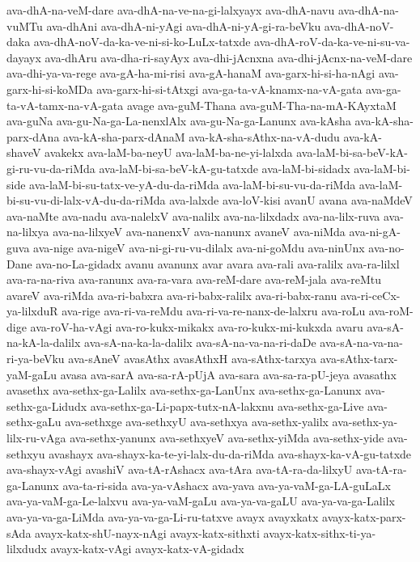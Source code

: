 {ava-dhA-na-veM-dare
ava-dhA-na-ve-na-gi-lalxyayx
ava-dhA-navu
ava-dhA-na-vuMTu
ava-dhAni
ava-dhA-ni-yAgi
ava-dhA-ni-yA-gi-ra-beVku
ava-dhA-noV-daka
ava-dhA-noV-da-ka-ve-ni-si-ko-LuLx-tatxde
ava-dhA-roV-da-ka-ve-ni-su-va-dayayx
ava-dhAru
ava-dha-ri-sayAyx
ava-dhi-jAcnxna
ava-dhi-jAcnx-na-veM-dare
ava-dhi-ya-va-rege
ava-gA-ha-mi-risi
ava-gA-hanaM
ava-garx-hi-si-ha-nAgi
ava-garx-hi-si-koMDa
ava-garx-hi-si-tAtxgi
ava-ga-ta-vA-knamx-na-vA-gata
ava-ga-ta-vA-tamx-na-vA-gata
avage
ava-guM-Thana
ava-guM-Tha-na-mA-KAyxtaM
ava-guNa
ava-gu-Na-ga-La-nenxlAlx
ava-gu-Na-ga-Lanunx
ava-kAsha
ava-kA-sha-parx-dAna
ava-kA-sha-parx-dAnaM
ava-kA-sha-sAthx-na-vA-dudu
ava-kA-shaveV
avakekx
ava-laM-ba-neyU
ava-laM-ba-ne-yi-lalxda
ava-laM-bi-sa-beV-kA-gi-ru-vu-da-riMda
ava-laM-bi-sa-beV-kA-gu-tatxde
ava-laM-bi-sidadx
ava-laM-bi-side
ava-laM-bi-su-tatx-ve-yA-du-da-riMda
ava-laM-bi-su-vu-da-riMda
ava-laM-bi-su-vu-di-lalx-vA-du-da-riMda
ava-lalxde
ava-loV-kisi
avanU
avana
ava-naMdeV
ava-naMte
ava-nadu
ava-nalelxV
ava-nalilx
ava-na-lilxdadx
ava-na-lilx-ruva
ava-na-lilxya
ava-na-lilxyeV
ava-nanenxV
ava-nanunx
avaneV
ava-niMda
ava-ni-gA-guva
ava-nige
ava-nigeV
ava-ni-gi-ru-vu-dilalx
ava-ni-goMdu
ava-ninUnx
ava-no-Dane
ava-no-La-gidadx
avanu
avanunx
avar
avara
ava-rali
ava-ralilx
ava-ra-lilxl
ava-ra-na-riva
ava-ranunx
ava-ra-vara
ava-reM-dare
ava-reM-jala
ava-reMtu
avareV
ava-riMda
ava-ri-babxra
ava-ri-babx-ralilx
ava-ri-babx-ranu
ava-ri-ceCx-ya-lilxduR
ava-rige
ava-ri-va-reMdu
ava-ri-va-re-nanx-de-lalxru
ava-roLu
ava-roM-dige
ava-roV-ha-vAgi
ava-ro-kukx-mikakx
ava-ro-kukx-mi-kukxda
avaru
ava-sA-na-kA-la-dalilx
ava-sA-na-ka-la-dalilx
ava-sA-na-va-na-ri-daDe
ava-sA-na-va-na-ri-ya-beVku
ava-sAneV
avasAthx
avasAthxH
ava-sAthx-tarxya
ava-sAthx-tarx-yaM-gaLu
avasa
ava-sarA
ava-sa-rA-pUjA
ava-sara
ava-sa-ra-pU-jeya
avasathx
avasethx
ava-sethx-ga-Lalilx
ava-sethx-ga-LanUnx
ava-sethx-ga-Lanunx
ava-sethx-ga-Lidudx
ava-sethx-ga-Li-papx-tutx-nA-lakxnu
ava-sethx-ga-Live
ava-sethx-gaLu
ava-sethxge
ava-sethxyU
ava-sethxya
ava-sethx-yalilx
ava-sethx-ya-lilx-ru-vAga
ava-sethx-yanunx
ava-sethxyeV
ava-sethx-yiMda
ava-sethx-yide
ava-sethxyu
avashayx
ava-shayx-ka-te-yi-lalx-du-da-riMda
ava-shayx-ka-vA-gu-tatxde
ava-shayx-vAgi
avashiV
ava-tA-rAshacx
ava-tAra
ava-tA-ra-da-lilxyU
ava-tA-ra-ga-Lanunx
ava-ta-ri-sida
ava-ya-vAshacx
ava-yava
ava-ya-vaM-ga-LA-guLaLx
ava-ya-vaM-ga-Le-lalxvu
ava-ya-vaM-gaLu
ava-ya-va-gaLU
ava-ya-va-ga-Lalilx
ava-ya-va-ga-LiMda
ava-ya-va-ga-Li-ru-tatxve
avayx
avayxkatx
avayx-katx-parx-sAda
avayx-katx-shU-nayx-nAgi
avayx-katx-sithxti
avayx-katx-sithx-ti-ya-lilxdudx
avayx-katx-vAgi
avayx-katx-vA-gidadx
}

